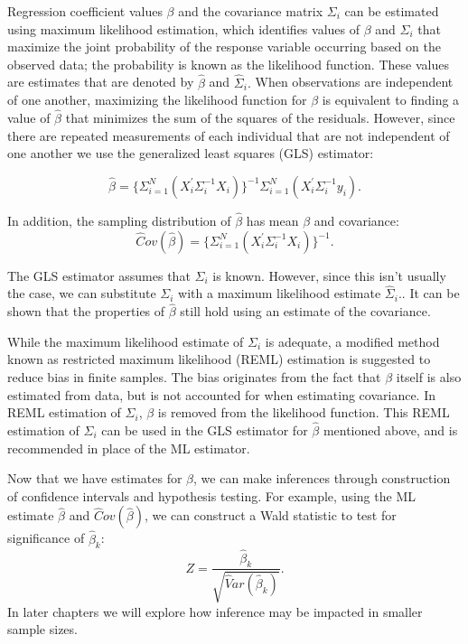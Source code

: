 \documentclass[12pt, twoside]{amherstthesis}
\begin{document}
Regression coefficient values \(\beta\) and the covariance matrix \(\Sigma_i\) can be estimated using maximum likelihood estimation, which identifies values of \(\beta\) and \(\Sigma_i\) that maximize the joint probability of the response variable occurring based on the observed data; the probability is known as the likelihood function. These values are estimates that are denoted by \(\hat\beta\) and \(\hat\Sigma_i.\) When observations are independent of one another, maximizing the likelihood function for \(\beta\) is equivalent to finding a value of \(\hat\beta\) that minimizes the sum of the squares of the residuals. However, since there are repeated measurements of each individual that are not independent of one another we use the generalized least squares (GLS) estimator:

\[\hat\beta = \{ \Sigma_{i=1}^N(X_i^{'}\Sigma^{-1}_iX_i) \}^{-1}\Sigma_{i=1}^N(X_i^{'}\Sigma^{-1}_iy_i).\]

In addition, the sampling distribution of \(\hat\beta\) has mean \(\beta\) and covariance:
\[\hat Cov(\hat\beta) = \{ \Sigma_{i=1}^N(X_i^{'}\Sigma^{-1}_iX_i) \}^{-1}.\]

The GLS estimator assumes that \(\Sigma_i\) is known. However, since this isn't usually the case, we can substitute \(\Sigma_i\) with a maximum likelihood estimate \(\hat\Sigma_i.\). It can be shown that the properties of \(\hat\beta\) still hold using an estimate of the covariance.

While the maximum likelihood estimate of \(\Sigma_i\) is adequate, a modified method known as restricted maximum likelihood (REML) estimation is suggested to reduce bias in finite samples. The bias originates from the fact that \(\beta\) itself is also estimated from data, but is not accounted for when estimating covariance. In REML estimation of \(\Sigma_i\), \(\beta\) is removed from the likelihood function. This REML estimation of \(\Sigma_i\) can be used in the GLS estimator for \(\hat\beta\) mentioned above, and is recommended in place of the ML estimator.

Now that we have estimates for \(\beta\), we can make inferences through construction of confidence intervals and hypothesis testing. For example, using the ML estimate \(\hat\beta\) and \(\hat Cov(\hat\beta)\), we can construct a Wald statistic to test for significance of \(\hat \beta_k\):
\[Z = \frac{\hat \beta_k}{\sqrt{\hat Var(\hat \beta_k)}}.\] In later chapters we will explore how inference may be impacted in smaller sample sizes.
\end{document}
